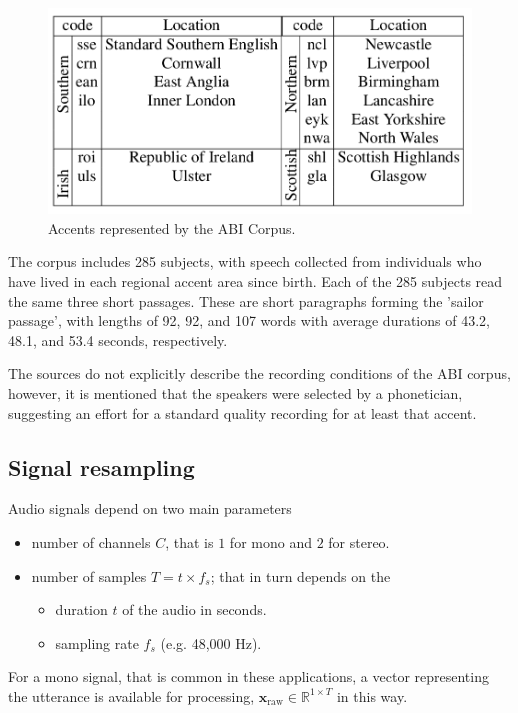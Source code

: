 \documentclass[conference]{IEEEtran}
\begin{document}
\begin{figure}[H]
	\centering
	\includegraphics[width=0.7\linewidth]{img/img-abi-corpus-accents}
	\caption{Accents represented by the ABI Corpus\cite{najafian2016improving}.}
	\label{fig:img-abi-corpus-accents}
\end{figure}

The corpus includes 285 subjects, with speech collected from individuals who have lived in each regional accent area since birth. Each of the 285 subjects read the same three short passages. These are short paragraphs forming the 'sailor passage', with lengths of 92, 92, and 107 words with average durations of 43.2, 48.1, and 53.4 seconds, respectively\cite{najafian2016improving}.

The sources do not explicitly describe the recording conditions of the ABI corpus, however, it is mentioned that the speakers were selected by a phonetician, suggesting an effort for a standard quality recording for at least that accent\cite{najafian2016improving}.

\subsection{Signal resampling}

Audio signals depend on two main parameters

\begin{itemize}
	\item number of channels $C$, that is $1$ for mono and $2$ for stereo.
	\item number of samples $T = t \times f_s$; that in turn depends on the
	\begin{itemize}
		\item duration $t$ of the audio in seconds.
		\item sampling rate $f_s$ (e.g. 48,000 Hz).
	\end{itemize}
	
\end{itemize}

For a mono signal, that is common in these applications, a vector representing the utterance is available for processing,  $\mathbf{x}_{\text{raw}} \in \mathbb{R}^{1 \times T}$ in this way.
\end{document}
